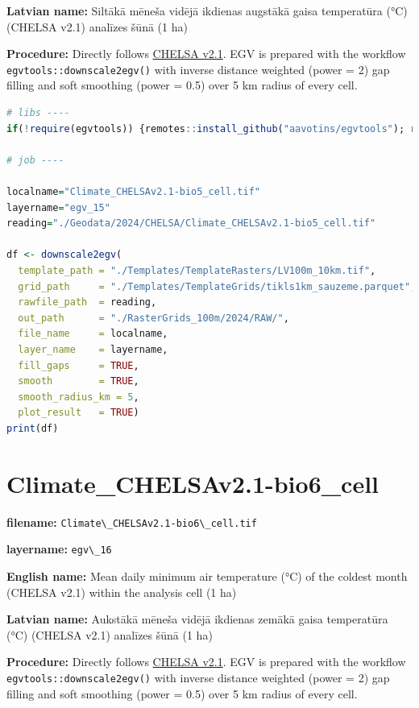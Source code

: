 \documentclass[
]{book}
\newcommand{\passthrough}[1]{#1}
\begin{document}
\textbf{Latvian name:} Siltākā mēneša vidējā ikdienas augstākā gaisa temperatūra (°C) (CHELSA v2.1) analīzes šūnā (1 ha)

\textbf{Procedure:} Directly follows \hyperref[Ch04.11]{CHELSA v2.1}. EGV is prepared with the
workflow \passthrough{\lstinline!egvtools::downscale2egv()!} with inverse distance weighted (power = 2)
gap filling and soft smoothing (power = 0.5) over 5 km radius of every cell.

\begin{lstlisting}[language=R]
# libs ----
if(!require(egvtools)) {remotes::install_github("aavotins/egvtools"); require(egvtools)}

# job ----

localname="Climate_CHELSAv2.1-bio5_cell.tif"
layername="egv_15"
reading="./Geodata/2024/CHELSA/Climate_CHELSAv2.1-bio5_cell.tif"

df <- downscale2egv(
  template_path = "./Templates/TemplateRasters/LV100m_10km.tif",
  grid_path     = "./Templates/TemplateGrids/tikls1km_sauzeme.parquet",
  rawfile_path  = reading,
  out_path      = "./RasterGrids_100m/2024/RAW/",
  file_name     = localname,
  layer_name    = layername,
  fill_gaps     = TRUE,
  smooth        = TRUE,
  smooth_radius_km = 5,
  plot_result   = TRUE)
print(df)
\end{lstlisting}

\section{Climate\_CHELSAv2.1-bio6\_cell}\label{ch06.016}

\textbf{filename:} \passthrough{\lstinline!Climate\_CHELSAv2.1-bio6\_cell.tif!}

\textbf{layername:} \passthrough{\lstinline!egv\_16!}

\textbf{English name:} Mean daily minimum air temperature (°C) of the coldest month (CHELSA v2.1) within the analysis cell (1 ha)

\textbf{Latvian name:} Aukstākā mēneša vidējā ikdienas zemākā gaisa temperatūra (°C) (CHELSA v2.1) analīzes šūnā (1 ha)

\textbf{Procedure:} Directly follows \hyperref[Ch04.11]{CHELSA v2.1}. EGV is prepared with the
workflow \passthrough{\lstinline!egvtools::downscale2egv()!} with inverse distance weighted (power = 2)
gap filling and soft smoothing (power = 0.5) over 5 km radius of every cell.
\end{document}

